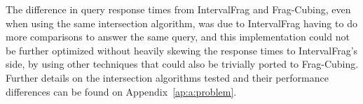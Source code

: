 The difference in query response times from IntervalFrag and Frag-Cubing, even when using the same intersection algorithm, was due to IntervalFrag having to do more comparisons to answer the same query, and this implementation could not be further optimized without heavily skewing the response times to IntervalFrag's side, by using other techniques that could also be trivially ported to Frag-Cubing.
Further details on the intersection algorithms tested and their performance differences can be found on Appendix~\ref{ap:a:problem}.

